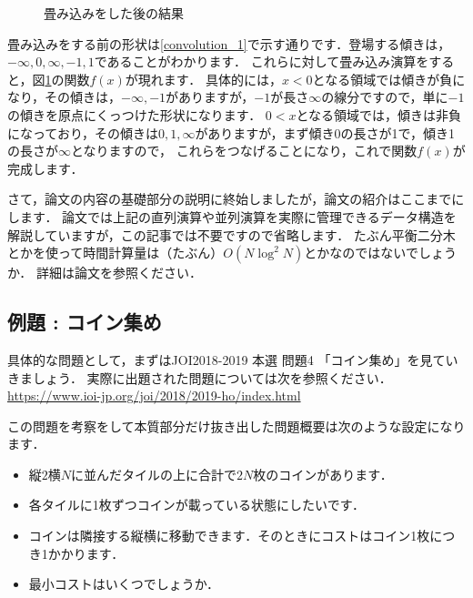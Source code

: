 \documentclass[13pt]{jarticle}
\begin{document}
\begin{figure}[htbp]
\centering
{}
\caption{畳み込みをした後の結果}
\label{convolution_2}
\end{figure}

畳み込みをする前の形状は\ref{convolution_1}で示す通りです．登場する傾きは，$-\infty, 0, \infty, -1, 1$であることがわかります．
これらに対して畳み込み演算をすると，図\ref{convolution_2}の関数$f(x)$が現れます．
具体的には，$x<0$となる領域では傾きが負になり，その傾きは，$-\infty, -1$がありますが，$-1$が長さ$\infty$の線分ですので，単に$-1$の傾きを原点にくっつけた形状になります．
$0<x$となる領域では，傾きは非負になっており，その傾きは$0, 1, \infty$がありますが，まず傾き0の長さが1で，傾き1の長さが$\infty$となりますので，
これらをつなげることになり，これで関数$f(x)$が完成します．

さて，論文の内容の基礎部分の説明に終始しましたが，論文の紹介はここまでにします．
論文では上記の直列演算や並列演算を実際に管理できるデータ構造を解説していますが，この記事では不要ですので省略します．
たぶん平衡二分木とかを使って時間計算量は（たぶん）$O(N \log^2N)$とかなのではないでしょうか．
詳細は論文を参照ください．

\subsection{例題 : コイン集め}

具体的な問題として，まずはJOI2018-2019 本選 問題4 「コイン集め」を見ていきましょう．
実際に出題された問題については次を参照ください． \url{https://www.ioi-jp.org/joi/2018/2019-ho/index.html}

この問題を考察をして本質部分だけ抜き出した問題概要は次のような設定になります．
\begin{itemize}
\item 縦$2$横$N$に並んだタイルの上に合計で$2N$枚のコインがあります．
\item 各タイルに1枚ずつコインが載っている状態にしたいです．
\item コインは隣接する縦横に移動できます．そのときにコストはコイン1枚につき1かかります．
\item 最小コストはいくつでしょうか．
\end{itemize}
\end{document}
